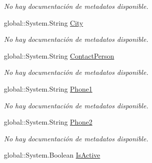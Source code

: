 \begin{DoxyCompactItemize}
\begin{DoxyCompactList}\small\item\em No hay documentación de metadatos disponible. \end{DoxyCompactList}\item 
global\-::\-System.\-String \hyperlink{class_microsoft_1_1_samples_1_1_kinect_1_1_basic_interactions_1_1_customers_a0cb59a00c3b9b0f786586ab794f794ac}{City}
\begin{DoxyCompactList}\small\item\em No hay documentación de metadatos disponible. \end{DoxyCompactList}\item 
global\-::\-System.\-String \hyperlink{class_microsoft_1_1_samples_1_1_kinect_1_1_basic_interactions_1_1_customers_a7844f1b164a7346d5ed2a352e1550db6}{Contact\-Person}
\begin{DoxyCompactList}\small\item\em No hay documentación de metadatos disponible. \end{DoxyCompactList}\item 
global\-::\-System.\-String \hyperlink{class_microsoft_1_1_samples_1_1_kinect_1_1_basic_interactions_1_1_customers_ac75d5572f76e532eeb33d37279b6e12f}{Phone1}
\begin{DoxyCompactList}\small\item\em No hay documentación de metadatos disponible. \end{DoxyCompactList}\item 
global\-::\-System.\-String \hyperlink{class_microsoft_1_1_samples_1_1_kinect_1_1_basic_interactions_1_1_customers_a90acf22a41fd892367045214c4dad1ae}{Phone2}
\begin{DoxyCompactList}\small\item\em No hay documentación de metadatos disponible. \end{DoxyCompactList}\item 
global\-::\-System.\-Boolean \hyperlink{class_microsoft_1_1_samples_1_1_kinect_1_1_basic_interactions_1_1_customers_ab5e7651a1c97aa115d93b166122217df}{Is\-Active}

\end{DoxyCompactItemize}
